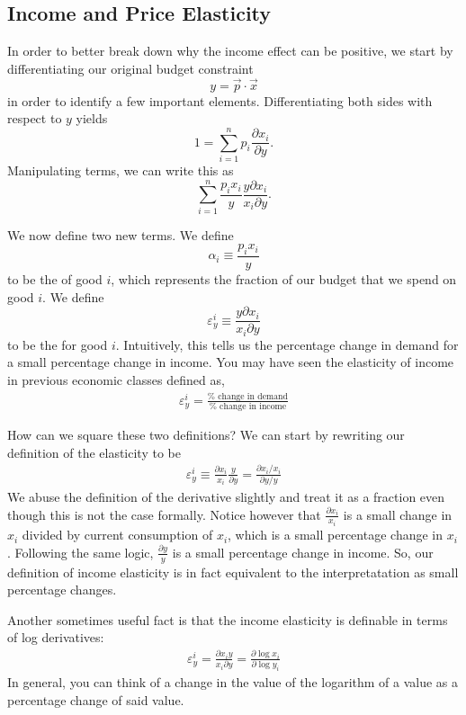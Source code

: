 \subsection*{Income and Price Elasticity}

In order to better break down why the income effect can be positive, we start by differentiating our original budget constraint
$$y = \vec{p} \cdot \vec{x}$$
in order to identify a few important elements. Differentiating both sides with respect to $y$ yields
$$1=\sum_{i=1}^{n} p_{i} \frac{\partial x_{i}}{\partial y}.$$
Manipulating terms, we can write this as 
$$
\sum_{i=1}^{n} \frac{p_{i} x_{i}}{y} \frac{y \partial x_{i}}{x_{i} \partial y}.
$$

We now define two new terms. We define 
$$\alpha_i \equiv \frac{p_{i} x_{i}}{y}$$
to be the  of good $i$, which represents the fraction of our budget that we spend on good $i$. We define 
$$\varepsilon_y^i \equiv \frac{y \partial x_{i}}{x_{i} \partial y}$$
to be the  for good $i$. Intuitively, this tells us the percentage change in demand for a small percentage change in income. You may have seen the elasticity of income in previous economic classes defined as,
\begin{align*}
    \varepsilon_y^i = \frac{\% \text{ change in demand}}{\% \text{ change in income}}
\end{align*}

How can we square these two definitions? We can start by rewriting our definition of the elasticity to be
\begin{align*}
    \varepsilon_y^i \equiv \frac{\partial x_i}{x_i}  \frac{y}{\partial y} = \frac{\partial x_i / x_i}{\partial y / y}
\end{align*}
We abuse the definition of the derivative slightly and treat it as a fraction even though this is not the case formally. Notice however that $\frac{\partial x_i}{x_i}$ is a small change in $x_i$ divided by current consumption of $x_i$, which is a small percentage change in $x_i$. Following the same logic, $\frac{\partial y}{y}$ is a small percentage change in income. So, our definition of income elasticity is in fact equivalent to the interpretatation as small percentage changes.

Another sometimes useful fact is that the income elasticity is definable in terms of log derivatives:
\begin{align*}
    \varepsilon_y^i = \frac{\partial x_i y}{x_i \partial y} = \frac{\partial \log x_i }{\partial \log y_i}
\end{align*}
In general, you can think of a change in the value of the logarithm of a value as a percentage change of said value. 

